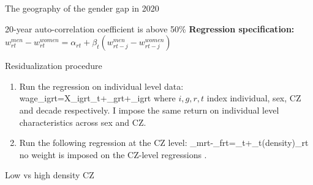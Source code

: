 \begin{frame}{The geography of the gender gap in 2020}
\label{slide:map}


\end{frame}

\begin{frame}{20-year auto-correlation coefficient is above 50\%} 
	\label{slide:persistence}
	\textbf{\alert{Regression specification:}} $w^{men}_{rt}-w^{women}_{rt}=\alpha_{rt}+\beta_{t}(w^{men}_{rt-j}-w^{women}_{rt-j})$
	
\end{frame}
\begin{frame}{Residualization procedure}
	\label{slide:residual}
	\begin{enumerate}
		\item Run the regression on \alert{individual} level data:
		\beqns
			wage_{igrt}=X_{igrt}\gamma_t+\lambda_{grt}+\varepsilon_{igrt}
		\eeqns
		where $i,g,r,t$ index individual, sex, CZ and decade respectively. I impose the \alert{same} return on individual level characteristics across sex and CZ.
		\item Run the following regression at the CZ level:
		\beqns
			\lambda_{mrt}-\lambda_{frt}=\alpha_t+\beta_{t}\ln(density)_{rt}
		\eeqns
		no weight is imposed on the CZ-level regressions \citep{Solon2015a}.
	\end{enumerate}
\end{frame}
\begin{frame}{Low vs high density CZ}
	\label{slide:distribution}
	
\end{frame}